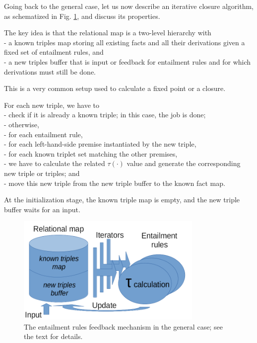 \documentclass[sn-mathphys]{sn-jnl}
\newcommand{\tab}{\hphantom{~}}
\begin{document}
Going back to the general case, let us now describe an iterative closure algorithm, as schematized in Fig. \ref{tau-architecture}, and discuss its properties.

The key idea is that the relational map is a two-level hierarchy with
\\- a known triples map storing all existing facts and all their derivations given a fixed set of entailment rules, and
\\- a new triples buffer that is input or feedback for entailment rules and for which derivations must still be done.

This is a very common setup used to calculate a fixed point or a closure.

For each new triple, we have to
\\ - check if it is already a known triple; in this case, the job is done;
\\ - otherwise,
\\ \tab - for each entailment rule,
\\ \tab \tab - for each left-hand-side premise instantiated by the new triple,
\\ \tab \tab \tab - for each known triplet set matching the other premises,
\\ \tab \tab \tab \tab - we have to calculate the related $\tau(\cdot)$ value and generate the corresponding new triple or triples; and
\\ \tab \tab \tab \tab - move this new triple from the new triple buffer to the known fact map.

At the initialization stage, the known triple map is empty, and the new triple buffer waits for an input.

\begin{figure}[htbp]
\centerline{\includegraphics[width=0.8\textwidth]{./tau-architecture.png}}
\caption{The entailment rules feedback mechanism in the general case; see the text for details.}
\label{tau-architecture}
\end{figure}
\end{document}
